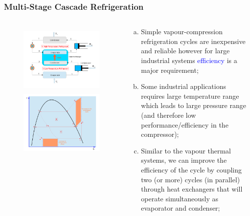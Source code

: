\documentclass[10pt,compress]{beamer}
\begin{document}
\begin{frame}
 \frametitle{Multi-Stage Cascade Refrigeration}
 \begin{columns}
  \begin{column}[c]{0.45\linewidth}
   \begin{figure}%
     \vbox{
      \includegraphics[width=4.5cm,height=3.5cm,clip]{./Pics/Overview_Refrig24}
      \vspace{-.1cm}
      \includegraphics[width=4.cm,height=4.cm,clip]{./Pics/Overview_Refrig25}}
   \end{figure}  
  \end{column}  
  \begin{column}[c]{0.55\linewidth}
   \begin{enumerate}[(a)]
    \item <1-> Simple vapour-compression refrigeration cycles are inexpensive and reliable however for large industrial systems \textcolor{blue}{efficiency} is a major requirement;
    \item <2-> Some industrial applications requires large temperature range which leads to large pressure range (and therefore low performance/efficiency in the compressor);
    \item <3-> Similar to the vapour thermal systems, we can improve the efficiency of the cycle by coupling two (or more) cycles (in parallel) through heat exchangers that will operate simultaneously as evaporator and condenser;
   \end{enumerate} 
  \end{column}  
 \end{columns} 
\end{frame}
\end{document}
